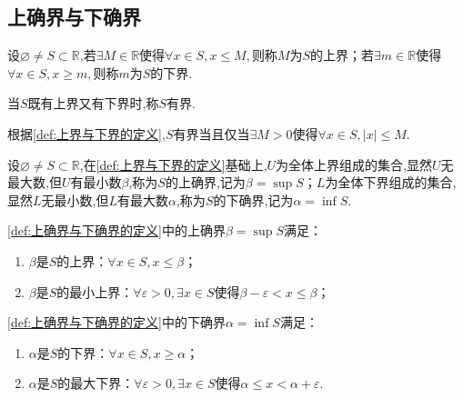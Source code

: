 \subsection{上确界与下确界}
\begin{formal}
    \begin{definition}[上界与下界的定义]\label{def:上界与下界的定义}
        设$\varnothing\neq S\subset\mathbb{R}$,若$\exists M\in\mathbb{R}$使得$\forall x\in S,x\leqslant M,$则称$M$为$S$的上界；若$\exists m \in\mathbb{R}$使得$\forall x\in S,x\geqslant m,$则称$m$为$S$的下界.
        
        当$S$既有上界又有下界时,称$S$有界.
    \end{definition}
\end{formal}
\begin{formal}
    \begin{definition}[有界的等价定义]\label{def:有界的等价定义}
        根据\cref{def:上界与下界的定义},$S$有界当且仅当$\exists M>0$使得$\forall x\in S,|x|\leqslant M$.
    \end{definition}
\end{formal}
\begin{formal}
    \begin{definition}[上确界与下确界的定义]\label{def:上确界与下确界的定义}
        设$\varnothing\neq S\subset\mathbb{R}$,在\cref{def:上界与下界的定义}基础上,$U$为全体上界组成的集合,显然$U$无最大数,但$U$有最小数$\beta$,称为$S$的上确界,记为$\beta=\sup S$；$L$为全体下界组成的集合,显然$L$无最小数,但$L$有最大数$\alpha$,称为$S$的下确界,记为$\alpha=\inf S$.
    \end{definition}
\end{formal}
\begin{formal}
    \begin{theorem}[上确界与下确界的性质]\label{thm:上确界与下确界的性质}
        \cref{def:上确界与下确界的定义}中的上确界$\beta=\sup S$满足：\begin{enumerate}[label={\textup{(\arabic*)}}]
            \item $\beta$是$S$的上界：$\forall x\in S,x\leqslant\beta$；
            \item $\beta$是$S$的最小上界：$\forall\varepsilon>0,\exists x\in S$使得$\beta-\varepsilon<x\leqslant\beta$；
        \end{enumerate}
        \cref{def:上确界与下确界的定义}中的下确界$\alpha=\inf S$满足：\begin{enumerate}[label={\textup{(\arabic*)}}]
            \item $\alpha$是$S$的下界：$\forall x\in S,x\geqslant\alpha$；
            \item $\alpha$是$S$的最大下界：$\forall\varepsilon>0,\exists x\in S$使得$\alpha\leqslant x<\alpha+\varepsilon$.
        \end{enumerate}
    \end{theorem}
\end{formal}
